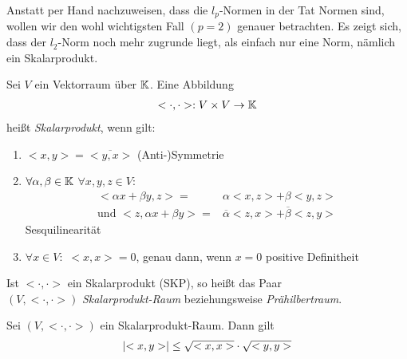 
Anstatt per Hand nachzuweisen, dass die $l_p$-Normen in der Tat Normen sind, 
wollen wir den wohl wichtigsten Fall $(p=2)$ genauer betrachten. Es zeigt sich, 
dass der $l_2$-Norm noch mehr zugrunde liegt, als einfach nur eine Norm, nämlich 
ein Skalarprodukt.

\begin{Definition}{%
	Sei $V$ ein Vektorraum über $\mathbb{K}$. Eine Abbildung 
	\begin{align*}
		< \cdot, \cdot >: V \times V \rightarrow \mathbb{K}
	\end{align*}		
	heißt \emph{Skalarprodukt}, wenn gilt:
	\begin{enumerate}[label=\subscript{S}{{\arabic*}}]
		\item \label{def:skalprod:1}$<x,y> = \overline{<y,x>}$ \glqq (Anti-)Symmetrie\grqq{}
		\item \label{def:skalprod:2} $\forall \alpha,\beta \in \mathbb{K}$ $\forall x,y,z \in V:$
		\begin{align*}
			<\alpha x + \beta y, z > = & \alpha <x,z> + \beta <y,z> \\
			\text{und } <z, \alpha x + \beta y > = &\overline{\alpha} <z,x> 
				+ \overline{\beta} <z, y >
		\end{align*}
		\glqq Sesquilinearität\grqq{}
		\item \label{def:skalprod:3} $\forall x \in V:$ $<x,x> = 0$, genau dann, wenn $x = 0$
		\glqq positive Definitheit\grqq{}
	\end{enumerate}
	Ist $<\cdot, \cdot>$ ein Skalarprodukt (SKP), so heißt das Paar \\
	$(V, <\cdot,\cdot>)$ \emph{Skalarprodukt-Raum} beziehungsweise 
	\emph{Prähilbertraum}.
}\end{Definition}

\begin{Lemma}{%
	Sei $(V, <\cdot,\cdot>)$ ein Skalarprodukt-Raum. Dann gilt
	\begin{align*}
		\abs{<x,y>} \leq \sqrt{<x,x>} \cdot \sqrt{<y,y>}
	\end{align*}
}\end{Lemma}


